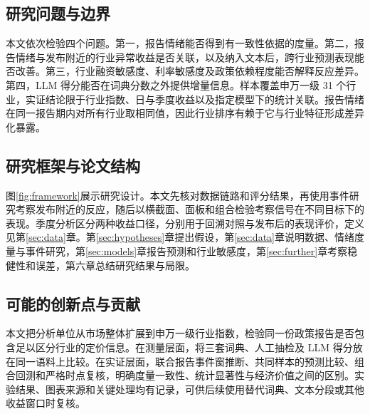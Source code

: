\subsection{研究问题与边界}

本文依次检验四个问题。第一，报告情绪能否得到有一致性依据的度量。第二，报告情绪与发布附近的行业异常收益是否关联，以及纳入文本后，跨行业预测表现能否改善。第三，行业融资敏感度、利率敏感度及政策依赖程度能否解释反应差异。第四，LLM 得分能否在词典分数之外提供增量信息。样本覆盖申万一级 31 个行业，实证结论限于行业指数、日与季度收益以及指定模型下的统计关联。报告情绪在同一报告期内对所有行业取相同值，因此行业排序有赖于它与行业特征形成差异化暴露。

\subsection{研究框架与论文结构}

图\ref{fig:framework}展示研究设计。本文先核对数据链路和评分结果，再使用事件研究考察发布附近的反应，随后以横截面、面板和组合检验考察信号在不同目标下的表现。季度分析区分两种收益口径，分别用于回溯对照与发布后的表现评价，定义见第\ref{sec:data}章。第\ref{sec:hypotheses}章提出假设，第\ref{sec:data}章说明数据、情绪度量与事件研究，第\ref{sec:models}章报告预测和行业敏感度，第\ref{sec:further}章考察稳健性和误差，第六章总结研究结果与局限。


\subsection{可能的创新点与贡献}

本文把分析单位从市场整体扩展到申万一级行业指数，检验同一份政策报告是否包含足以区分行业的定价信息。在测量层面，将三套词典、人工抽检及 LLM 得分放在同一语料上比较。在实证层面，联合报告事件窗推断、共同样本的预测比较、组合回测和严格时点复核，明确度量一致性、统计显著性与经济价值之间的区别。实验结果、图表来源和关键处理均有记录，可供后续使用替代词典、文本分段或其他收益窗口时复核。
